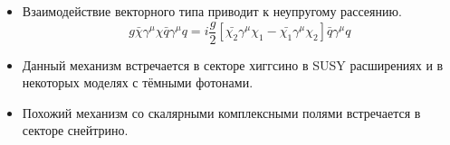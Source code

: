 \begin{itemize}
	\item Взаимодействие векторного типа приводит к неупругому рассеянию.
	\begin{equation*} 
		g\bar{\chi}\gamma^{\mu}\chi \bar{q}\gamma^{\mu}q = i\frac{g}{2}
		\left[ \bar{\chi_2}\gamma^{\mu}\chi_1  -  \bar{\chi_1}\gamma^{\mu}\chi_2\right]\bar{q}\gamma^{\mu}q
	\end{equation*} 
	\item Данный механизм встречается в секторе хиггсино в SUSY расширениях и в некоторых моделях с тёмными фотонами.
	\item Похожий механизм со скалярными комплексными полями встречается в секторе снейтрино.
\end{itemize}